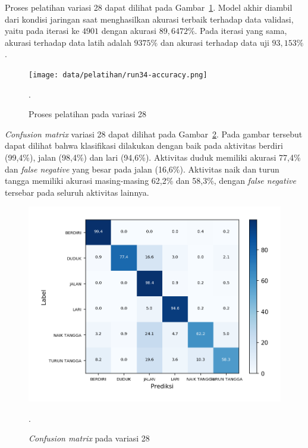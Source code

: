 Proses pelatihan variasi 28 dapat dilihat pada Gambar~\ref{gambar:run34-training}. Model akhir diambil dari kondisi jaringan saat menghasilkan akurasi terbaik terhadap data validasi, yaitu pada iterasi ke $4901$ dengan akurasi $89,6472\%$. Pada iterasi yang sama, akurasi terhadap data latih adalah $9375\%$ dan akurasi terhadap data uji  $93,153\%$.

\begin{figure}[h!]
    \centering
    \texttt{[image: data/pelatihan/run34-accuracy.png]}
    \caption{Proses pelatihan pada variasi 28}.
    \label{gambar:run34-training}
\end{figure}

\textit{Confusion matrix} variasi 28 dapat dilihat pada Gambar~\ref{gambar:run34-confusion-martix}. Pada gambar tersebut dapat dilihat bahwa klasifikasi dilakukan dengan baik pada aktivitas berdiri (99,4\%), jalan (98,4\%) dan lari (94,6\%). Aktivitas duduk memiliki akurasi 77,4\% dan \textit{false negative} yang besar pada jalan (16,6\%). Aktivitas naik dan turun tangga memiliki akurasi masing-masing 62,2\% dan 58,3\%, dengan \textit{false negative} tersebar pada seluruh aktivitas lainnya.

\begin{figure}[h!]
    \centering
    \includegraphics[width=13cm]{gambar/hasil-pembahasan/run34-confusion-matrix.png}
    \caption{\textit{Confusion matrix} pada variasi 28}.
    \label{gambar:run34-confusion-martix}
\end{figure}


